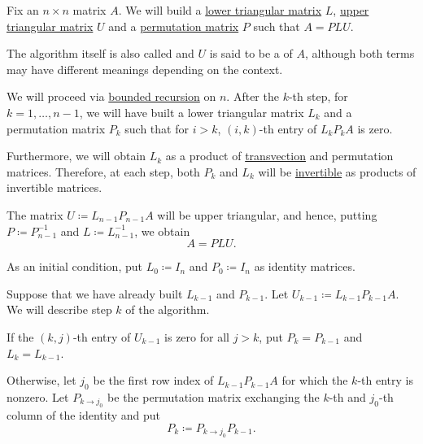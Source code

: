 \begin{algorithm}\label{alg:plu_decomposition}
  Fix an \( n \times n \) matrix \( A \). We will build a \hyperref[def:triangular_matrix]{lower triangular matrix} \( L \), \hyperref[def:triangular_matrix]{upper triangular matrix} \( U \) and a \hyperref[def:elementary_matrix/permutation]{permutation matrix} \( P \) such that \( A = PLU \).

  The algorithm itself is also called  and \( U \) is said to be a  of \( A \), although both terms may have different meanings depending on the context.

  We will proceed via \hyperref[thm:bounded_transfinite_recursion]{bounded recursion} on \( n \). After the \( k \)-th step, for \( k = 1, \ldots, n - 1 \), we will have built a lower triangular matrix \( L_k \) and a permutation matrix \( P_k \) such that for \( i > k \), \( (i, k) \)-th entry of \( L_k P_k A \) is zero.

  Furthermore, we will obtain \( L_k \) as a product of \hyperref[def:elementary_matrix/transvection]{transvection} and permutation matrices. Therefore, at each step, both \( P_k \) and \( L_k \) will be \hyperref[def:inverse_matrix]{invertible} as products of invertible matrices.

  The matrix \( U \coloneqq L_{n-1} P_{n-1} A \) will be upper triangular, and hence, putting \( P \coloneqq P_{n-1}^{-1} \) and \( L \coloneqq L_{n-1}^{-1} \), we obtain
  \begin{equation*}
    A = PLU.
  \end{equation*}

  \begin{thmenum}
     As an initial condition, put \( L_0 \coloneqq I_n \) and \( P_0 \coloneqq I_n \) as identity matrices.

     Suppose that we have already built \( L_{k-1} \) and \( P_{k-1} \). Let \( U_{k-1} \coloneqq L_{k-1} P_{k-1} A \). We will describe step \( k \) of the algorithm.

    If the \( (k, j) \)-th entry of \( U_{k-1} \) is zero for all \( j > k \), put \( P_k = P_{k-1} \) and \( L_k = L_{k-1} \).

    Otherwise, let \( j_0 \) be the first row index of \( L_{k-1} P_{k-1} A \) for which the \( k \)-th entry is nonzero. Let \( P_{k \to j_0} \) be the permutation matrix exchanging the \( k \)-th and \( j_0 \)-th column of the identity and put
    \begin{equation*}
      P_k \coloneqq P_{k \to j_0} P_{k-1}.
    \end{equation*}


\end{thmenum}
\end{algorithm}
